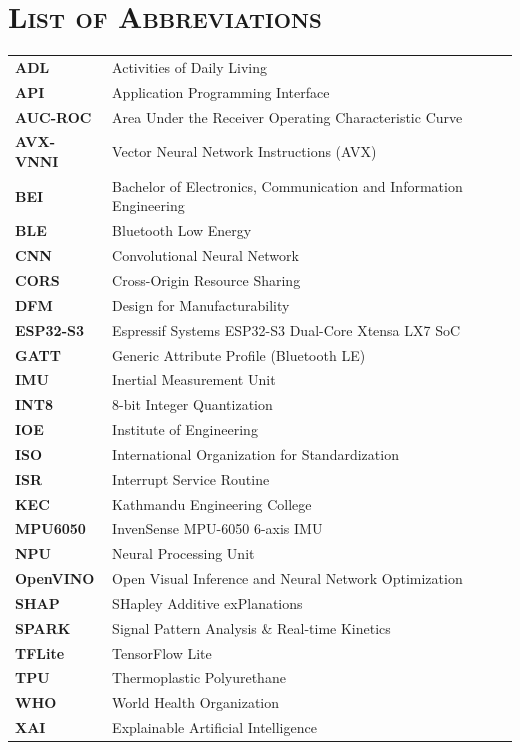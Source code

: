 
\chapter*{\scshape List of Abbreviations}
\begin{longtable}{@{}p{3.5cm}p{10.5cm}@{}}
\textbf{ADL}      & Activities of Daily Living \\[4pt]
\textbf{API}      & Application Programming Interface \\[4pt]
\textbf{AUC-ROC}  & Area Under the Receiver Operating Characteristic Curve \\[4pt]
\textbf{AVX-VNNI} & Vector Neural Network Instructions (AVX) \\[4pt]
\textbf{BEI}      & Bachelor of Electronics, Communication and Information Engineering \\[4pt]
\textbf{BLE}      & Bluetooth Low Energy \\[4pt]
\textbf{CNN}      & Convolutional Neural Network \\[4pt]
\textbf{CORS}     & Cross-Origin Resource Sharing \\[4pt]
\textbf{DFM}      & Design for Manufacturability \\[4pt]
\textbf{ESP32-S3} & Espressif Systems ESP32-S3 Dual-Core Xtensa LX7 SoC \\[4pt]
\textbf{GATT}     & Generic Attribute Profile (Bluetooth LE) \\[4pt]
\textbf{IMU}      & Inertial Measurement Unit \\[4pt]
\textbf{INT8}     & 8-bit Integer Quantization \\[4pt]
\textbf{IOE}      & Institute of Engineering \\[4pt]
\textbf{ISO}      & International Organization for Standardization \\[4pt]
\textbf{ISR}      & Interrupt Service Routine \\[4pt]
\textbf{KEC}      & Kathmandu Engineering College \\[4pt]
\textbf{MPU6050}  & InvenSense MPU-6050 6-axis IMU \\[4pt]
\textbf{NPU}      & Neural Processing Unit \\[4pt]
\textbf{OpenVINO} & Open Visual Inference and Neural Network Optimization \\[4pt]
\textbf{SHAP}     & SHapley Additive exPlanations \\[4pt]
\textbf{SPARK}    & Signal Pattern Analysis \& Real-time Kinetics \\[4pt]
\textbf{TFLite}   & TensorFlow Lite \\[4pt]
\textbf{TPU}      & Thermoplastic Polyurethane \\[4pt]
\textbf{WHO}      & World Health Organization \\[4pt]
\textbf{XAI}      & Explainable Artificial Intelligence \\[4pt]
\end{longtable}